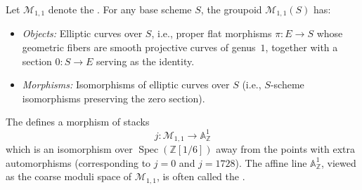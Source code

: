 \begin{definition} \label{definition:moduli_stack_of_elliptic_curves_j_line}
Let $\mathcal{M}_{1,1}$ denote the . For any base scheme $S$, the groupoid $\mathcal{M}_{1,1}(S)$ has:

\begin{itemize}
    \item \textit{Objects:} Elliptic curves over $S$, i.e., proper flat morphisms $\pi: E \to S$ whose geometric fibers are smooth projective curves of genus~$1$, together with a section $0: S \to E$ serving as the identity.
    \item \textit{Morphisms:} Isomorphisms of elliptic curves over $S$ (i.e., $S$-scheme isomorphisms preserving the zero section).
\end{itemize}

The  defines a morphism of stacks
$$ j: \mathcal{M}_{1,1} \to \mathbb{A}^1_{\mathbb{Z}} $$
which is an isomorphism over $\operatorname{Spec}(\mathbb{Z}[1/6])$ away from the points with extra automorphisms (corresponding to $j=0$ and $j=1728$). The affine line $\mathbb{A}^1_{\mathbb{Z}}$, viewed as the coarse moduli space of $\mathcal{M}_{1,1}$, is often called the .
\end{definition}

